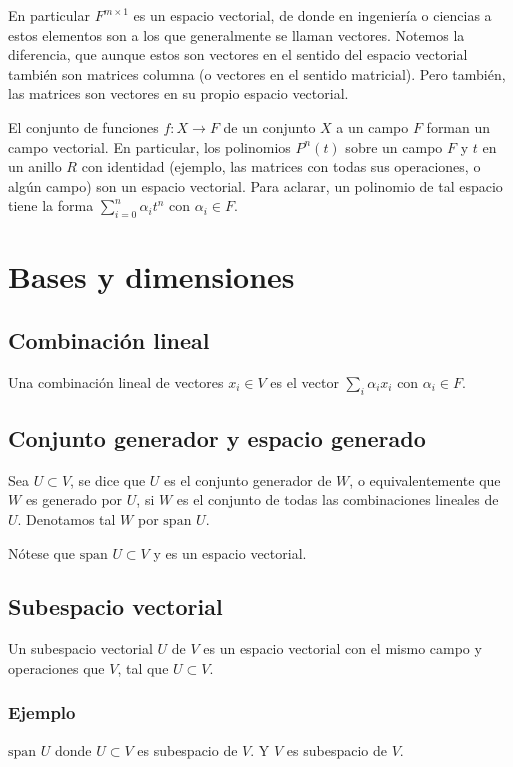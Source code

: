 \documentclass{article}
\begin{document}
En particular $F^{m\times 1}$ es un espacio vectorial, de donde
en ingeniería o ciencias a estos elementos son a los que generalmente se llaman vectores. Notemos la diferencia, que aunque estos son vectores en el sentido del espacio vectorial también son matrices columna (o vectores en el sentido matricial). Pero también, las matrices son vectores en su propio espacio vectorial.

El conjunto de funciones $f: X \rightarrow F$ de un conjunto $X$
a un campo $F$ forman un campo vectorial. En particular, los polinomios $P^n(t)$ sobre un campo $F$ y $t$ en un anillo $R$ con identidad (ejemplo, las matrices con todas sus operaciones, o algún campo) son un espacio vectorial. Para aclarar, un polinomio de tal espacio tiene
la forma $\sum^n_{i=0} \alpha_i t^n$ con $\alpha_i\in F$.
\newpage

\section{Bases y dimensiones}
\subsection{Combinación lineal}
Una combinación lineal de vectores $x_i \in V$ es el vector $\sum_i \alpha_i x_i$ con $\alpha_i\in F$.

\newcommand{\spn}{\text{span }}
\subsection{Conjunto generador y espacio generado}
Sea $U\subset V$, se dice que $U$ es el conjunto generador de $W$,
o equivalentemente que $W$ es generado por $U$, si 
$W$ es el conjunto de todas las combinaciones lineales de $U$.
Denotamos tal $W$ por $\spn U$.

Nótese que $\spn U\subset V$ y es un espacio vectorial.

\subsection{Subespacio vectorial}
Un subespacio vectorial $U$ de $V$ es un espacio vectorial
con el mismo campo y operaciones que $V$, tal que $U\subset V$.

\subsubsection*{Ejemplo}
$\spn U$ donde $U\subset V$ es subespacio de $V$. Y $V$ es subespacio de $V$.
\end{document}
